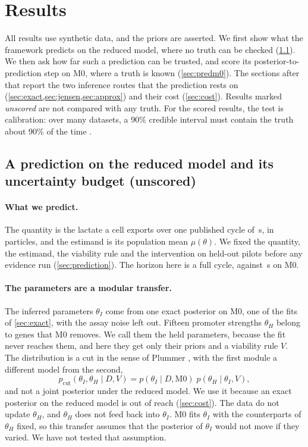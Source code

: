 \section{Results}
\label{sec:results}

All results use synthetic data, and the priors are asserted. We first show what the
framework predicts on the reduced \syn{} model, where no truth can be checked
(\cref{sec:budget}). We then ask how far such a prediction can be trusted, and score its posterior-to-prediction step on M0, where a truth is known (\cref{sec:predm0}). The sections after
that report the two inference routes that the prediction rests on
(\cref{sec:exact,sec:jensen,sec:approx}) and their cost (\cref{sec:cost}). Results
marked \emph{unscored} are not compared with any truth. For the scored results, the
test is calibration: over many datasets, a 90\% credible interval must contain the
truth about 90\% of the time \cite{talts2018validating}.

\subsection{A prediction on the reduced model and its uncertainty budget (unscored)}
\label{sec:budget}

\paragraph{What we predict.} The quantity is the lactate a cell exports over one
published cycle of \,s, in particles, and the estimand is its population
mean $\mu(\theta)$. We fixed the quantity, the estimand, the viability rule and the
intervention on held-out pilots before any evidence run (\cref{sec:prediction}). The horizon here is a full cycle, against \,s on M0.

\paragraph{The parameters are a modular transfer.} The  inferred parameters $\theta_I$ come from one exact posterior on M0, one of the fits of \cref{sec:exact}, with the assay noise left out. Fifteen promoter strengths $\theta_H$ belong to genes that M0 removes. We call them the held parameters, because the fit never reaches them, and here they get only their priors and a viability rule $V$. The distribution is a cut in the sense of Plummer \cite{plummer2015cuts}, with the first module a different model from the second,
\begin{equation}
  p_{\mathrm{cut}}(\theta_I, \theta_H \mid D, V)
  = p(\theta_I \mid D, \mathrm{M0})\; p(\theta_H \mid \theta_I, V),
\end{equation}
and not a joint posterior under the reduced model. We use it because an exact posterior
on the reduced model is out of reach (\cref{sec:cost}). The data do not update
$\theta_H$, and $\theta_H$ does not feed back into $\theta_I$. M0 fits $\theta_I$ with the counterparts of $\theta_H$ fixed, so this transfer assumes that the posterior
of $\theta_I$ would not move if they varied. We have not tested that assumption.

